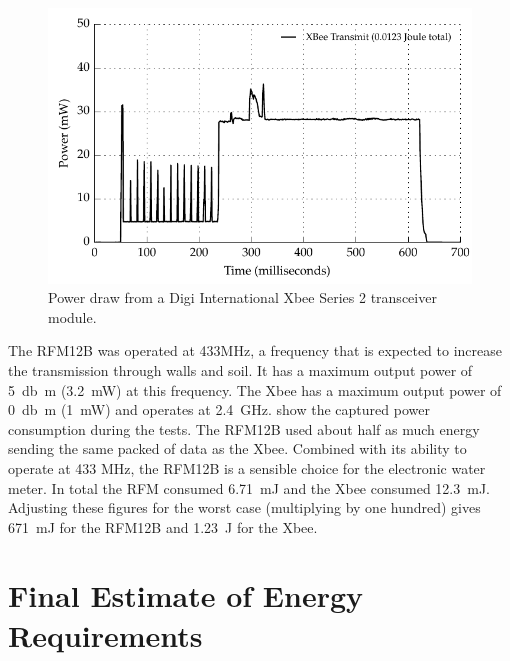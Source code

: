     \begin{figure}
      \centering
      \includegraphics{content/pt1/03-EnergyRequirements/graphics/Graph_XbeePower.pdf}
      \caption{\label{fig:Energy-consumed-XBee}Power draw from a Digi International Xbee Series 2 transceiver module.}
    \end{figure}

    The RFM12B was operated at 433MHz, a frequency that is expected to increase the transmission through walls and soil.
    It has a maximum output power of \SI{5}{\decibel m} (\SI{3.2}{\milli\watt}) at this frequency.
    The Xbee has a maximum output power of \SI{0}{\decibel m} (\SI{1}{\milli\watt}) and operates at \SI{2.4}{\giga\hertz}.
     show the captured power consumption during the tests.
    The RFM12B used about half as much energy sending the same packed of data as the Xbee.
    Combined with its ability to operate at 433 MHz, the RFM12B is a sensible choice for the electronic water meter.
    In total the RFM consumed \SI{6.71}{\milli\joule} and the Xbee consumed \SI{12.3}{\milli\joule}.
    Adjusting these figures for the worst case (multiplying by one hundred) gives \SI{671}{\milli\joule} for the RFM12B and \SI{1.23}{\joule} for the Xbee.

  \section{Final Estimate of Energy Requirements}


